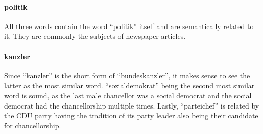 \paragraph{politik}
All three words contain the word \enquote{politik} itself and are semantically related to it.
They are commonly the subjects of newspaper articles.

\paragraph{kanzler}
Since \enquote{kanzler} is the short form of \enquote{bundeskanzler}, it makes sense to see the latter as the most similar word.
\enquote{sozialdemokrat} being the second most similar word is sound, as the last male chancellor was a social democrat and the social democrat had the chancellorship multiple times.
Lastly, \enquote{parteichef} is related by the CDU party having the tradition of its party leader also being their candidate for chancellorship.
